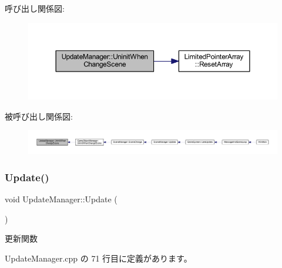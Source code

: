 呼び出し関係図\+:
\nopagebreak
\begin{figure}[H]
\begin{center}
\leavevmode
\includegraphics[width=350pt]{class_update_manager_a2e0a6b1a620ba620783d929e532b6148_cgraph}
\end{center}
\end{figure}
被呼び出し関係図\+:
\nopagebreak
\begin{figure}[H]
\begin{center}
\leavevmode
\includegraphics[width=350pt]{class_update_manager_a2e0a6b1a620ba620783d929e532b6148_icgraph}
\end{center}
\end{figure}
\mbox{\label{class_update_manager_ac4bdd39d106c7e6b505fe9a0c55e50de}} 
\subsubsection{\texorpdfstring{Update()}{Update()}}
{\footnotesize\ttfamily void Update\+Manager\+::\+Update (\begin{DoxyParamCaption}{ }\end{DoxyParamCaption})}



更新関数 



 Update\+Manager.\+cpp の 71 行目に定義があります。

